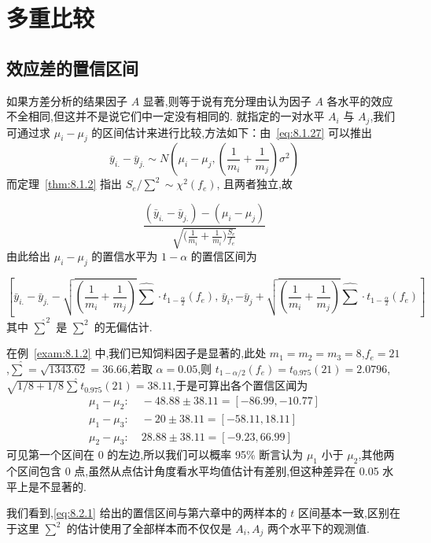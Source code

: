 \section{多重比较}\label{sec:8.2}
\subsection{效应差的置信区间} \label{ssec:8.2.1}
如果方差分析的结果因子 $A$ 显著,则等于说有充分理由认为因子 $A$ 各水平的效应不全相同,但这并不是说它们中一定没有相同的. 就指定的一对水平 $A_i$ 与 $A_j$,我们可通过求 $\mu_i - \mu_j$ 的区间估计来进行比较,方法如下：由~\eqref{eq:8.1.27} 可以推出
\begin{equation*}
  \bar{y}_{i.} - \bar{y}_{j.} \sim N \left(\mu_{i}-\mu_{j},\left(\frac{1}{m_{i}}+\frac{1}{m_{j}}\right) \sigma^{2}\right)
\end{equation*}
而定理~\ref{thm:8.1.2} 指出 $S_e/\sum^2 \sim \chi^2(f_e)$, 且两者独立,故

\begin{equation*}
  \frac{(\bar{y}_{i.} - \bar{y}_{j.}) - (\mu_i - \mu_j) }{\sqrt{\big(\frac{1}{m_i} + \frac{1}{m_i}\big) \frac{S_e}{f_e}}}
\end{equation*}
由此给出 $\mu_i -\mu_j$ 的置信水平为 $1-\alpha$ 的置信区间为

\begin{equation}\label{eq:8.2.1}
  \left[\bar{y}_{i.}-\bar{y}_{j.}-\sqrt{\left(\frac{1}{m_{i}}+\frac{1}{m_{j}}\right)} \hat{\sum} \cdot t_{1-\frac{\alpha}{2}}\left(f_{e}\right),\,\bar{y}_{i},-\bar{y}_{j}+\sqrt{\left(\frac{1}{m_{i}}+\frac{1}{m_{j}}\right)} \hat{\sum} \cdot t_{1-\frac{\alpha}{2}}\left(f_{e}\right)\right]
\end{equation}
其中 $\hat{\sum}^2$ 是 $\sum^2$ 的无偏估计.

\begin{example}\label{exam:8.2.1}
在例~\ref{exam:8.1.2} 中,我们已知饲料因子是显著的,此处 $m_1=m_2=
m_3 = 8$,$f_e = 21$,$\hat{\sum}=\sqrt{1343.62} = 36.66$,若取 $\alpha=0.05$,则 $t_{1-\alpha/2}(f_e)=
t_{0.975}(21) = 2.0796$, $\sqrt{1/8+1/8} \hat{\sum} t_{0.975}(21) = 38.11$,于是可算出各个置信区闻为
\begin{align*} 
\mu_{1}-\mu_{2} : &\; -48.88 \pm 38.11=[-86.99,-10.77] \\ 
\mu_{1}-\mu_{3} : &\; -20 \pm 38.11=[-58.11,18.11] \\ 
\mu_{2}-\mu_{3} : &\; 28.88 \pm 38.11=[-9.23,66.99] 
\end{align*}
可见第一个区间在 0 的左边,所以我们可以概率 95\% 断言认为 $\mu_1$ 小于 $\mu_2$,其他两个区间包含 0 点,虽然从点估计角度看水平均值估计有差别,但这种差异在 0.05 水平上是不显著的.

我们看到,\eqref{eq:8.2.1} 给出的置信区间与第六章中的两样本的 $t$ 区间基本一致,区别在于这里 $\sum^2$ 的估计使用了全部样本而不仅仅是 $A_i, A_j$ 两个水平下的观测值.
\end{example}

